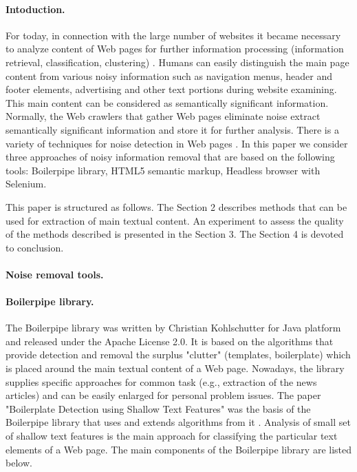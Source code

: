 \paragraph{Intoduction.} For today, in connection with the large number of websites it became necessary to analyze content of Web pages for further information processing (information retrieval, classification, clustering) \cite{Chakrabarti2}. Humans can easily distinguish the main page content from various noisy information such as navigation menus, header and footer elements, advertising and other text portions during website examining. This main content can be considered as semantically significant information. Normally, the Web crawlers that gather Web pages eliminate noise extract semantically significant information and store it for further analysis. There is a variety of techniques for noise detection in Web pages \cite{YiLiuLi}. In this paper we consider three approaches of noisy information removal that are based on the following tools: Boilerpipe library, HTML5 semantic markup, Headless browser with Selenium.

This paper is structured as follows. The Section 2 describes methods that can be used for extraction of main textual content. An experiment to assess the quality of the methods described is presented in the Section 3. The Section 4 is devoted to conclusion.

\paragraph{Noise removal tools.}
\paragraph{Boilerpipe library.} The Boilerpipe library was written by Christian Kohlschutter for Java platform and released under the Apache License 2.0. It is based on the algorithms that provide detection and removal the surplus "clutter" (templates, boilerplate) which is placed around the main textual content of a Web page. Nowadays, the library supplies specific approaches for common task (e.g., extraction of the news articles) and can be easily enlarged for personal problem issues. The paper "Boilerplate Detection using Shallow Text Features" was the basis of the Boilerpipe library that uses and extends algorithms from it \cite{KohlschutterFankhauserNejdl}. Analysis of small set of shallow text features is the main approach for classifying the particular text elements of a Web page. The main components of the Boilerpipe library are listed below.

